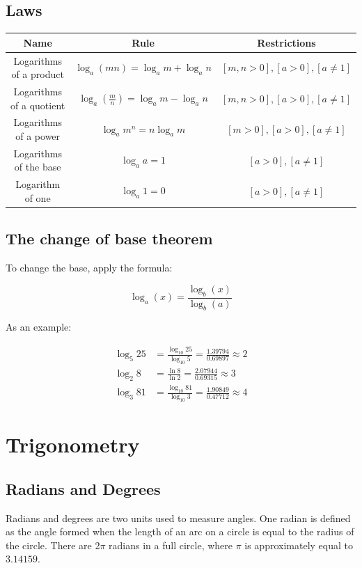 \documentclass{book}
\begin{document}
\section{Laws}
\begin{center}
	\begin{tabular}{c|c|c}
		Name                     & Rule                                      & Restrictions                        \\ \hline
		Logarithms of a product  & $\log_a(mn) = \log_am + \log_an$          & $[m, n > 0], [a > 0], [a \not = 1]$ \\
		Logarithms of a quotient & $\log_a(\frac{m}{n}) = \log_am - \log_an$ & $[m, n > 0], [a > 0], [a \not = 1]$ \\
		Logarithms of a power    & $\log_am^n = n\log_am$                    & $[m > 0], [a > 0], [a \not = 1]$    \\
		Logarithms of the base   & $\log_aa = 1$                             & $[a > 0], [a \not = 1]$             \\
		Logarithm of one         & $\log_a 1 = 0$                            & $[a > 0], [a \not = 1]$
	\end{tabular}
\end{center}



\section{The change of base theorem}
To change the base, apply the formula:

\[
	\log_{a}{(x)} = \frac{\log_{b}{(x)}}{\log_{b}{(a)}}
\]

As an example:

\begin{align*}
	\log_{5}25 & = \frac{\log_{10}25}{\log_{10}5} = \frac{1.39794}{0.69897} \approx 2 \\
	\log_{2}8  & = \frac{\ln 8}{\ln 2} = \frac{2.07944}{0.69315} \approx 3            \\
	\log_{3}81 & = \frac{\log_{10}81}{\log_{10}3} = \frac{1.90849}{0.47712} \approx 4
\end{align*}




\chapter{Trigonometry}
\section{Radians and Degrees}
Radians and degrees are two units used to measure angles.  One radian is defined as the angle formed when the length of an arc on a circle is equal to the radius of the circle. There are 2$\pi$ radians in a full circle, where $\pi$ is approximately equal to $3.14159$.
\end{document}
